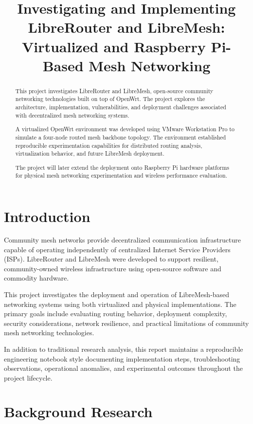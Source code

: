 \documentclass[conference]{IEEEtran}
\title{
Investigating and Implementing LibreRouter and LibreMesh:
Virtualized and Raspberry Pi-Based Mesh Networking
}
\author{
\IEEEauthorblockN{\small
Bastas, Dimitrios (SUPREMER LEFTIEUENT COMMANDER)\\
Kamilos, Dimitrios (SUPREMEISH RIGHTIEUNENT COMMANDER)\\
Robert Leyba (LT)\\
Rachel Goldstein (LT)\\
Margaret Moore (LTJG)
}
\IEEEauthorblockA{
EC3730 Final Project
}
}
\begin{document}
\maketitle

\begin{abstract}

This project investigates LibreRouter and LibreMesh, open-source community networking technologies built on top of OpenWrt. The project explores the architecture, implementation, vulnerabilities, and deployment challenges associated with decentralized mesh networking systems.

A virtualized OpenWrt environment was developed using VMware Workstation Pro to simulate a four-node routed mesh backbone topology. The environment established reproducible experimentation capabilities for distributed routing analysis, virtualization behavior, and future LibreMesh deployment.

The project will later extend the deployment onto Raspberry Pi hardware platforms for physical mesh networking experimentation and wireless performance evaluation.

\end{abstract}

\section{Introduction}

Community mesh networks provide decentralized communication infrastructure capable of operating independently of centralized Internet Service Providers (ISPs). LibreRouter and LibreMesh were developed to support resilient, community-owned wireless infrastructure using open-source software and commodity hardware.

This project investigates the deployment and operation of LibreMesh-based networking systems using both virtualized and physical implementations. The primary goals include evaluating routing behavior, deployment complexity, security considerations, network resilience, and practical limitations of community mesh networking technologies.

In addition to traditional research analysis, this report maintains a reproducible engineering notebook style documenting implementation steps, troubleshooting observations, operational anomalies, and experimental outcomes throughout the project lifecycle.

\section{Background Research}
\end{document}
